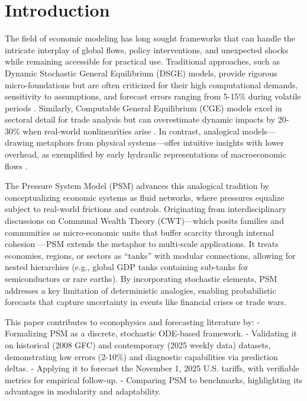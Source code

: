 \documentclass[11pt]{article}
\begin{document}
\section{Introduction}
The field of economic modeling has long sought frameworks that can handle the intricate interplay of global flows, policy interventions, and unexpected shocks while remaining accessible for practical use. Traditional approaches, such as Dynamic Stochastic General Equilibrium (DSGE) models, provide rigorous micro-foundations but are often criticized for their high computational demands, sensitivity to assumptions, and forecast errors ranging from 5-15\% during volatile periods \citep{christiano2018dsge, delnegro2013dsge, smets2007shocks, farmer2009virtues}. Similarly, Computable General Equilibrium (CGE) models excel in sectoral detail for trade analysis but can overestimate dynamic impacts by 20-30\% when real-world nonlinearities arise \citep{dixon2013validation, kehoe2005general, burfisher2017introduction}. In contrast, analogical models---drawing metaphors from physical systems---offer intuitive insights with lower overhead, as exemplified by early hydraulic representations of macroeconomic flows \citep{phillips1950mechanical, colander2008moniac, vines2000phillips, leijonhufvud2006uses}.

The Pressure System Model (PSM) advances this analogical tradition by conceptualizing economic systems as fluid networks, where pressures equalize subject to real-world frictions and controls. Originating from interdisciplinary discussions on Communal Wealth Theory (CWT)---which posits families and communities as micro-economic units that buffer scarcity through internal cohesion \citep{mcentire2025communal, lewis1966culture}---PSM extends the metaphor to multi-scale applications. It treats economies, regions, or sectors as ``tanks'' with modular connections, allowing for nested hierarchies (e.g., global GDP tanks containing sub-tanks for semiconductors or rare earths). By incorporating stochastic elements, PSM addresses a key limitation of deterministic analogies, enabling probabilistic forecasts that capture uncertainty in events like financial crises or trade wars.

This paper contributes to econophysics and forecasting literature by:
- Formalizing PSM as a discrete, stochastic ODE-based framework.
- Validating it on historical (2008 GFC) and contemporary (2025 weekly data) datasets, demonstrating low errors (2-10\%) and diagnostic capabilities via prediction deltas.
- Applying it to forecast the November 1, 2025 U.S. tariffs, with verifiable metrics for empirical follow-up.
- Comparing PSM to benchmarks, highlighting its advantages in modularity and adaptability.
\end{document}
